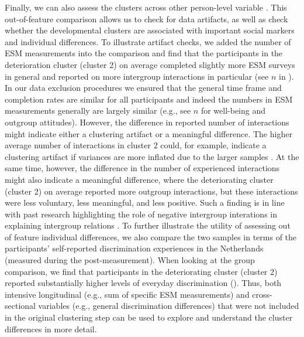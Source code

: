 Finally, we can also assess the clusters across other person-level
variable \citep[e.g.,][]{monden2022}. This out-of-feature comparison
allows us to check for data artifacts, as well as check whether the
developmental clusters are associated with important social markers and
individual differences. To illustrate artifact checks, we added the
number of ESM measurements into the comparison and find that the
participants in the deterioration cluster (cluster 2) on average
completed slightly more ESM surveys in general and reported on more
intergroup interactions in particular (see \(n\) in
). In our data exclusion procedures we
ensured that the general time frame and completion rates are similar for
all participants and indeed the numbers in ESM measurements generally
are largely similar (e.g., see \(n\) for well-being and outgroup
attitudes). However, the difference in reported number of interactions
might indicate either a clustering artifact or a meaningful difference.
The higher average number of interactions in cluster 2 could, for
example, indicate a clustering artifact if variances are more inflated
due to the larger samples \citep{kogan2006}. At the same time, however,
the difference in the number of experienced interactions might also
indicate a meaningful difference, where the deteriorating cluster
(cluster 2) on average reported more outgroup interactions, but these
interactions were less voluntary, less meaningful, and less positive.
Such a finding is in line with past research highlighting the role of
negative intergroup interations in explaining intergroup relations
\citep[e.g.,][]{Barlow2012, Prati2021, Graf2014}. To further illustrate
the utility of assessing out of feature individual differences, we also
compare the two samples in terms of the participants' self-reported
discrimination experiences in the Netherlands (measured during the
post-measurement). When looking at the group comparison, we find that
participants in the deteriorating cluster (cluster 2) reported
substantially higher levels of everyday discrimination
(). Thus, both intensive longitudinal
(e.g., sum of specific ESM measurements) and cross-sectional variables
(e.g., general discrimination differences) that were not included in the
original clustering step can be used to explore and understand the
cluster differences in more detail.

